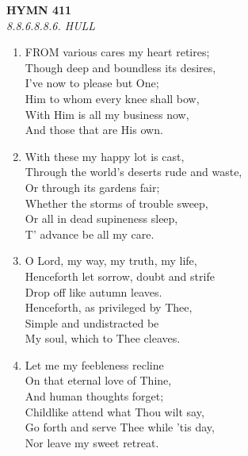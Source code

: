 \newpage
\begin{center}
    {\Large \textbf{HYMN 411}}
    \\
    \textit{8.8.6.8.8.6. HULL}
\end{center}
\vspace{1em}

\begin{enumerate}
    \item FROM various cares my heart retires; \\
        Though deep and boundless its desires, \\
        I've now to please but One; \\
        Him to whom every knee shall bow, \\
        With Him is all my business now, \\
        And those that are His own.

    \item With these my happy lot is cast, \\
        Through the world's deserts rude and waste, \\
        Or through its gardens fair; \\
        Whether the storms of trouble sweep, \\
        Or all in dead supineness sleep, \\
        T' advance be all my care.

    \item O Lord, my way, my truth, my life, \\
        Henceforth let sorrow, doubt and strife \\
        Drop off like autumn leaves. \\
        Henceforth, as privileged by Thee, \\
        Simple and undistracted be \\
        My soul, which to Thee cleaves.

    \item Let me my feebleness recline \\
        On that eternal love of Thine, \\
        And human thoughts forget; \\
        Childlike attend what Thou wilt say, \\
        Go forth and serve Thee while 'tis day, \\
        Nor leave my sweet retreat.

\end{enumerate}

